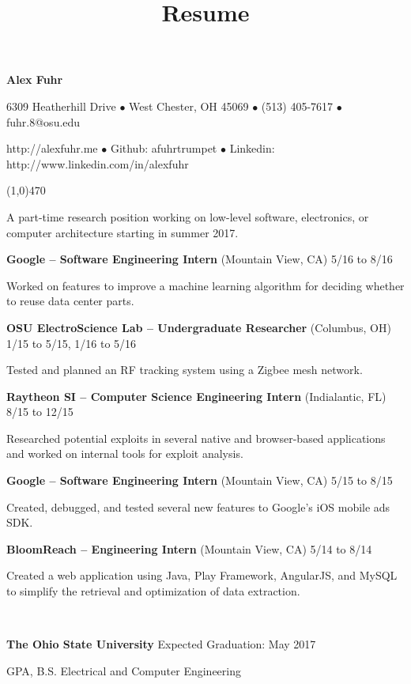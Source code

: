 \documentclass[10pt]{article}
\title{Resume}
\begin{document}
\centerline{{\LARGE \bf Alex Fuhr}}
\centerline{6309 Heatherhill Drive $\bullet$ West Chester, OH 45069 $\bullet$ (513) 405-7617 $\bullet$ fuhr.8@osu.edu}
\centerline{http://alexfuhr.me $\bullet$ Github: afuhrtrumpet $\bullet$ Linkedin: http://www.linkedin.com/in/alexfuhr}
\noindent
\line(1,0){470}\\

\smallskip

\noindent
A part-time research position working on low-level software, electronics, or computer architecture starting in summer 2017.
\medskip

\smallskip

\centerline{{\large {\bf Google -- Software Engineering Intern} (Mountain View, CA) \hfill 5/16 to 8/16}}
\noindent
Worked on features to improve a machine learning algorithm for deciding whether to reuse data center parts.
\smallskip

\centerline{{\large {\bf OSU ElectroScience Lab -- Undergraduate Researcher} (Columbus, OH) \hfill 1/15 to 5/15, 1/16 to 5/16}}
\noindent
Tested and planned an RF tracking system using a Zigbee mesh network.
\smallskip

\centerline{{\large {\bf Raytheon SI -- Computer Science Engineering Intern} (Indialantic, FL) \hfill 8/15 to 12/15}}
\noindent
Researched potential exploits in several native and browser-based applications and worked on internal tools for exploit analysis.
\smallskip

\centerline{{\large {\bf Google -- Software Engineering Intern} (Mountain View, CA) \hfill 5/15 to 8/15}}
\noindent
Created, debugged, and tested several new features to Google's iOS mobile ads SDK.
\smallskip

\centerline{{\large {\bf BloomReach -- Engineering Intern} (Mountain View, CA) \hfill 5/14 to 8/14}}
\noindent
Created a web application using Java, Play Framework, AngularJS, and MySQL to simplify the retrieval and optimization of data extraction.
\smallskip

\\
\smallskip
\centerline{{\large {\bf The Ohio State University} \hfill Expected Graduation: May 2017}}
 GPA, B.S. Electrical and Computer Engineering
\medskip
\end{document}
